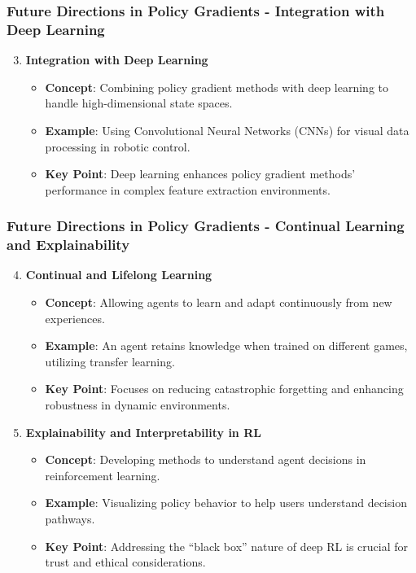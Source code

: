 \documentclass{beamer}
\begin{document}
\begin{frame}[fragile]
    \frametitle{Future Directions in Policy Gradients - Integration with Deep Learning}
    \begin{enumerate}
        \setcounter{enumi}{2}
        \item \textbf{Integration with Deep Learning}
            \begin{itemize}
                \item \textbf{Concept}: Combining policy gradient methods with deep learning to handle high-dimensional state spaces.
                \item \textbf{Example}: Using Convolutional Neural Networks (CNNs) for visual data processing in robotic control.
                \item \textbf{Key Point}: Deep learning enhances policy gradient methods' performance in complex feature extraction environments.
            \end{itemize}
    \end{enumerate}
\end{frame}

\begin{frame}[fragile]
    \frametitle{Future Directions in Policy Gradients - Continual Learning and Explainability}
    \begin{enumerate}
        \setcounter{enumi}{3}
        \item \textbf{Continual and Lifelong Learning}
            \begin{itemize}
                \item \textbf{Concept}: Allowing agents to learn and adapt continuously from new experiences.
                \item \textbf{Example}: An agent retains knowledge when trained on different games, utilizing transfer learning.
                \item \textbf{Key Point}: Focuses on reducing catastrophic forgetting and enhancing robustness in dynamic environments.
            \end{itemize}
        \item \textbf{Explainability and Interpretability in RL}
            \begin{itemize}
                \item \textbf{Concept}: Developing methods to understand agent decisions in reinforcement learning.
                \item \textbf{Example}: Visualizing policy behavior to help users understand decision pathways.
                \item \textbf{Key Point}: Addressing the “black box” nature of deep RL is crucial for trust and ethical considerations.
            \end{itemize}
    \end{enumerate}
\end{frame}
\end{document}
